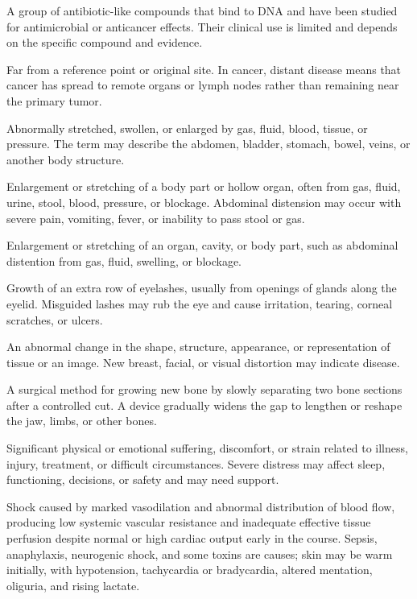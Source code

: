  A group of antibiotic-like compounds that bind to DNA and have been studied for antimicrobial or anticancer effects. Their clinical use is limited and depends on the specific compound and evidence.

 Far from a reference point or original site. In cancer, distant disease means that cancer has spread to remote organs or lymph nodes rather than remaining near the primary tumor.

 Abnormally stretched, swollen, or enlarged by gas, fluid, blood, tissue, or pressure. The term may describe the abdomen, bladder, stomach, bowel, veins, or another body structure.

 Enlargement or stretching of a body part or hollow organ, often from gas, fluid, urine, stool, blood, pressure, or blockage. Abdominal distension may occur with severe pain, vomiting, fever, or inability to pass stool or gas.

 Enlargement or stretching of an organ, cavity, or body part, such as abdominal distention from gas, fluid, swelling, or blockage.

 Growth of an extra row of eyelashes, usually from openings of glands along the eyelid. Misguided lashes may rub the eye and cause irritation, tearing, corneal scratches, or ulcers.

 An abnormal change in the shape, structure, appearance, or representation of tissue or an image. New breast, facial, or visual distortion may indicate disease.

 A surgical method for growing new bone by slowly separating two bone sections after a controlled cut. A device gradually widens the gap to lengthen or reshape the jaw, limbs, or other bones.

 Significant physical or emotional suffering, discomfort, or strain related to illness, injury, treatment, or difficult circumstances. Severe distress may affect sleep, functioning, decisions, or safety and may need support.

 Shock caused by marked vasodilation and abnormal distribution of blood flow, producing low systemic vascular resistance and inadequate effective tissue perfusion despite normal or high cardiac output early in the course. Sepsis, anaphylaxis, neurogenic shock, and some toxins are causes; skin may be warm initially, with hypotension, tachycardia or bradycardia, altered mentation, oliguria, and rising lactate.


